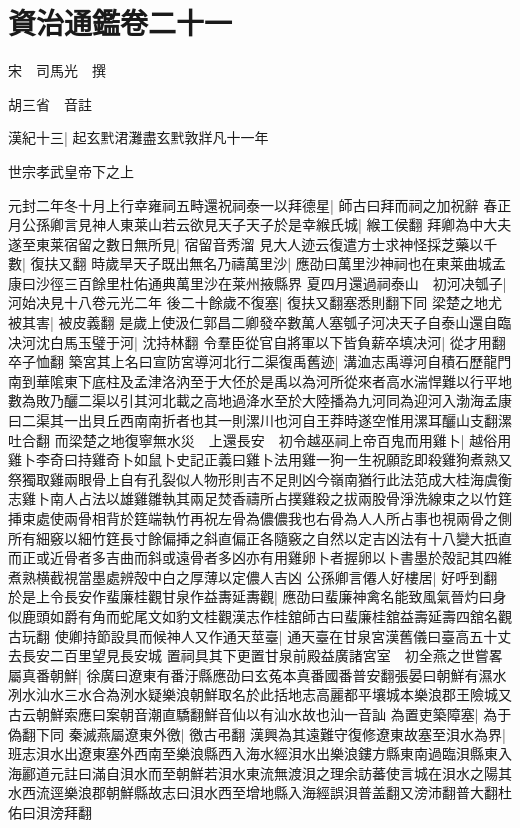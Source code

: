 \chapter{資治通鑑卷二十一}
宋　司馬光　撰

胡三省　音註

漢紀十三|{
	起玄黓涒灘盡玄黓敦牂凡十一年}


世宗孝武皇帝下之上

元封二年冬十月上行幸雍祠五畤還祝祠泰一以拜德星|{
	師古曰拜而祠之加祝辭}
春正月公孫卿言見神人東莱山若云欲見天子天子於是幸緱氏城|{
	緱工侯翻}
拜卿為中大夫遂至東莱宿留之數日無所見|{
	宿留音秀溜}
見大人迹云復遣方士求神怪採芝藥以千數|{
	復扶又翻}
時歲旱天子既出無名乃禱萬里沙|{
	應劭曰萬里沙神祠也在東莱曲城孟康曰沙徑三百餘里杜佑通典萬里沙在莱州掖縣界}
夏四月還過祠泰山　初河决瓠子|{
	河始决見十八卷元光二年}
後二十餘歲不復塞|{
	復扶又翻塞悉則翻下同}
梁楚之地尤被其害|{
	被皮義翻}
是歲上使汲仁郭昌二卿發卒數萬人塞瓠子河决天子自泰山還自臨决河沈白馬玉璧于河|{
	沈持林翻}
令羣臣從官自將軍以下皆負薪卒填决河|{
	從才用翻卒子恤翻}
築宮其上名曰宣防宮導河北行二渠復禹舊迹|{
	溝洫志禹導河自積石歷龍門南到華隂東下底柱及孟津洛汭至于大伾於是禹以為河所從來者高水湍悍難以行平地數為敗乃釃二渠以引其河北載之高地過洚水至於大陸播為九河同為迎河入渤海孟康曰二渠其一出貝丘西南南折者也其一則漯川也河自王莽時遂空惟用漯耳釃山支翻漯吐合翻}
而梁楚之地復寧無水災　上還長安　初令越巫祠上帝百鬼而用雞卜|{
	越俗用雞卜李奇曰持雞奇卜如鼠卜史記正義曰雞卜法用雞一狗一生祝願訖即殺雞狗煮熟又祭獨取雞兩眼骨上自有孔裂似人物形則吉不足則凶今嶺南猶行此法范成大桂海虞衡志雞卜南人占法以雄雞雛執其兩足焚香禱所占撲雞殺之拔兩股骨淨洗線束之以竹筳挿束處使兩骨相背於筳端執竹再祝左骨為儂儂我也右骨為人人所占事也視兩骨之側所有細竅以細竹筳長寸餘偏挿之斜直偏正各隨竅之自然以定吉凶法有十八變大扺直而正或近骨者多吉曲而斜或遠骨者多凶亦有用雞卵卜者握卵以卜書墨於殻記其四維煮熟横截視當墨處辨殻中白之厚薄以定儂人吉凶}
公孫卿言僊人好樓居|{
	好呼到翻}
於是上令長安作蜚廉桂觀甘泉作益夀延夀觀|{
	應劭曰蜚廉神禽名能致風氣晉灼曰身似鹿頭如爵有角而蛇尾文如豹文桂觀漢志作桂舘師古曰蜚廉桂舘益壽延壽四舘名觀古玩翻}
使卿持節設具而候神人又作通天莖臺|{
	通天臺在甘泉宮漢舊儀曰臺高五十丈去長安二百里望見長安城}
置祠具其下更置甘泉前殿益廣諸宮室　初全燕之世嘗畧屬真番朝鮮|{
	徐廣曰遼東有番汙縣應劭曰玄菟本真番國番普安翻張晏曰朝鮮有濕水冽水汕水三水合為洌水疑樂浪朝鮮取名於此括地志高麗都平壤城本樂浪郡王險城又古云朝鮮索應曰案朝音潮直驕翻鮮音仙以有汕水故也汕一音訕}
為置吏築障塞|{
	為于偽翻下同}
秦滅燕屬遼東外徼|{
	徼古弔翻}
漢興為其遠難守復修遼東故塞至浿水為界|{
	班志浿水出遼東塞外西南至樂浪縣西入海水經浿水出樂浪鏤方縣東南過臨浿縣東入海酈道元註曰滿自浿水而至朝鮮若浿水東流無渡浿之理余訪蕃使言城在浿水之陽其水西流逕樂浪郡朝鮮縣故志曰浿水西至增地縣入海經誤浿普盖翻又滂沛翻普大翻杜佑曰浿滂拜翻}
